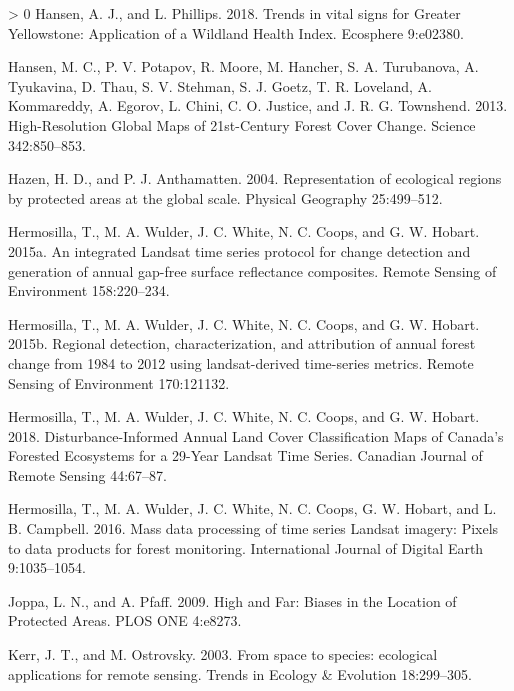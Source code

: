 \documentclass[10pt,oneside]{article}
\newlength{\cslhangindent}
\newenvironment{CSLReferences}[3] %
 {%
  \setlength{\parindent}{0pt}
  \ifodd #1 \everypar{\setlength{\hangindent}{\cslhangindent}}\ignorespaces\fi
  \ifnum #2 > 0
  \setlength{\parskip}{#2\baselineskip}
  \fi
 }%
 {}
\begin{document}
\begin{CSLReferences}{1}{0}
\leavevmode\hypertarget{ref-hansenTrendsVitalSigns2018}{}%
Hansen, A. J., and L. Phillips. 2018. Trends in vital signs for Greater
Yellowstone: Application of a Wildland Health Index. Ecosphere 9:e02380.

\leavevmode\hypertarget{ref-hansenHighResolutionGlobalMaps2013}{}%
Hansen, M. C., P. V. Potapov, R. Moore, M. Hancher, S. A. Turubanova, A.
Tyukavina, D. Thau, S. V. Stehman, S. J. Goetz, T. R. Loveland, A.
Kommareddy, A. Egorov, L. Chini, C. O. Justice, and J. R. G. Townshend.
2013. High-Resolution Global Maps of 21st-Century Forest Cover Change.
Science 342:850--853.

\leavevmode\hypertarget{ref-hazen2004}{}%
Hazen, H. D., and P. J. Anthamatten. 2004. Representation of ecological
regions by protected areas at the global scale. Physical Geography
25:499--512.

\leavevmode\hypertarget{ref-hermosillaIntegratedLandsatTime2015}{}%
Hermosilla, T., M. A. Wulder, J. C. White, N. C. Coops, and G. W.
Hobart. 2015a. An integrated Landsat time series protocol for change
detection and generation of annual gap-free surface reflectance
composites. Remote Sensing of Environment 158:220--234.

\leavevmode\hypertarget{ref-hermosilla2015}{}%
Hermosilla, T., M. A. Wulder, J. C. White, N. C. Coops, and G. W.
Hobart. 2015b. Regional detection, characterization, and attribution of
annual forest change from 1984 to 2012 using landsat-derived time-series
metrics. Remote Sensing of Environment 170:121132.

\leavevmode\hypertarget{ref-hermosillaDisturbanceInformedAnnualLand2018}{}%
Hermosilla, T., M. A. Wulder, J. C. White, N. C. Coops, and G. W.
Hobart. 2018. Disturbance-Informed Annual Land Cover Classification Maps
of Canada's Forested Ecosystems for a 29-Year Landsat Time Series.
Canadian Journal of Remote Sensing 44:67--87.

\leavevmode\hypertarget{ref-hermosillaMassDataProcessing2016}{}%
Hermosilla, T., M. A. Wulder, J. C. White, N. C. Coops, G. W. Hobart,
and L. B. Campbell. 2016. Mass data processing of time series Landsat
imagery: Pixels to data products for forest monitoring. International
Journal of Digital Earth 9:1035--1054.

\leavevmode\hypertarget{ref-joppa2009}{}%
Joppa, L. N., and A. Pfaff. 2009. High and Far: Biases in the Location
of Protected Areas. PLOS ONE 4:e8273.

\leavevmode\hypertarget{ref-kerr2003}{}%
Kerr, J. T., and M. Ostrovsky. 2003. From space to species: ecological
applications for remote sensing. Trends in Ecology \& Evolution
18:299--305.


\end{CSLReferences}
\end{document}
